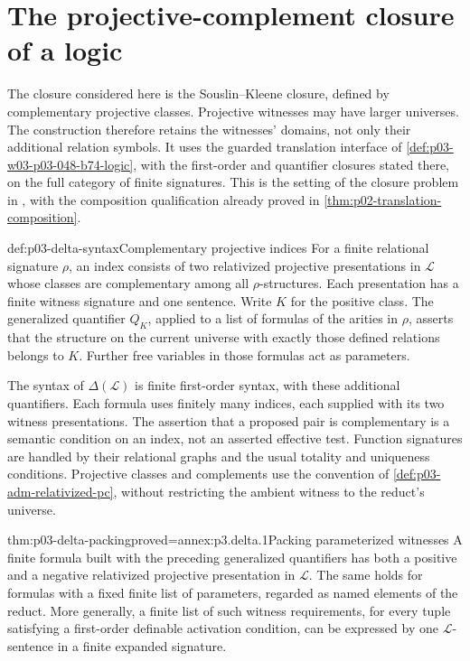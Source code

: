 \section{The projective-complement closure of a logic}
\label{sec:p03-delta-closure}

The closure considered here is the Souslin--Kleene closure, defined by
complementary projective classes. Projective witnesses may have larger
universes. The construction therefore retains the witnesses' domains,
not only their additional relation symbols. It uses the guarded
translation interface of \cref{def:p03-w03-p03-048-b74-logic}, with the
first-order and quantifier closures stated there, on the full category
of finite signatures. This is the setting of the closure problem in
\cite[Part~II, \S4, pp.~260--262]{Barwise1974Axioms}, with the
composition qualification already proved in
\cref{thm:p02-translation-composition}.

\begin{hbdefinition}{def:p03-delta-syntax}{Complementary projective indices}
For a finite relational signature \(\rho\), an index consists of two
relativized projective presentations in \(\mathcal L\) whose classes
are complementary among all \(\rho\)-structures. Each presentation
has a finite witness signature and one sentence. Write \(K\) for the
positive class. The generalized quantifier \(Q_K\), applied to a list
of formulas of the arities in \(\rho\), asserts that the structure on
the current universe with exactly those defined relations belongs to
\(K\). Further free variables in those formulas act as parameters.

The syntax of \(\Delta(\mathcal L)\) is finite first-order syntax,
with these additional quantifiers. Each formula uses finitely many
indices, each supplied with its two witness presentations. The assertion
that a proposed pair is complementary is a semantic condition on an
index, not an asserted effective test. Function signatures are handled
by their relational graphs and the usual totality and uniqueness
conditions. Projective classes and complements use the convention of
\cref{def:p03-adm-relativized-pc}, without restricting the ambient
witness to the reduct's universe.
\end{hbdefinition}

\begin{hblemma}{thm:p03-delta-packing}{proved=annex:p3.delta.1}{Packing parameterized witnesses}
A finite formula built with the preceding generalized quantifiers has
both a positive and a negative relativized projective presentation in
\(\mathcal L\). The same holds for formulas with a fixed finite list
of parameters, regarded as named elements of the reduct. More generally,
a finite list of such witness requirements, for every tuple satisfying
a first-order definable activation condition, can be expressed by one
\(\mathcal L\)-sentence in a finite expanded signature.
\end{hblemma}

